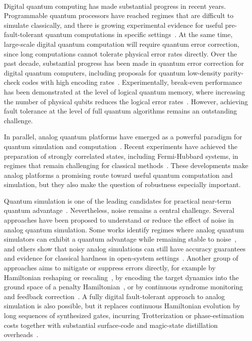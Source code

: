 \documentclass[10pt,twocolumn,superscriptaddress,aps,amsmath,amssymb,citeautoscript,floatfix,prx,longbibliography]{revtex4-2}
\newcounter{alg}
\theoremstyle{plain}
\theoremstyle{plain}
\theoremstyle{plain}
\theoremstyle{plain}
\theoremstyle{plain}
\theoremstyle{plain}
\begin{document}
\\
Digital quantum computing has made substantial progress in recent years. Programmable quantum processors have reached regimes that are difficult to simulate classically, and there is growing experimental evidence for useful pre-fault-tolerant quantum computations in specific settings~\cite{Arute2019,Kim2023}. At the same time, large-scale digital quantum computation will require quantum error correction, since long computations cannot tolerate physical error rates directly. Over the past decade, substantial progress has been made in quantum error correction for digital quantum computers, including proposals for quantum low-density parity-check codes with high encoding rates~\cite{Bravyi2024,Panteleev2022,Breuckmann2021,Qian1}. Experimentally, break-even performance has been demonstrated at the level of logical quantum memory, where increasing the number of physical qubits reduces the logical error rates~\cite{Krinner2022,AcharyaGoogle2025,RyanAnderson2021,daSilvaPaetznick2024,Reichardt2024Tesseract,Bluvstein2024,Reichardt2024NeutralAtom}. However, achieving fault tolerance at the level of full quantum algorithms remains an outstanding challenge.

In parallel, analog quantum platforms have emerged as a powerful paradigm for quantum simulation and computation~\cite{Bloch2012,Browaeys2020,Daley2022,Schaefer2020}. Recent experiments have achieved the preparation of strongly correlated states, including Fermi-Hubbard systems, in regimes that remain challenging for classical methods~\cite{Xu2025,Mazurenko2017,Shao2024,Chalopin2024}. 
These developments make analog platforms a promising route toward useful quantum computation and simulation, but they also make the question of robustness especially important.

Quantum simulation is one of the leading candidates for practical near-term quantum advantage~\cite{Daley2022}. Nevertheless, noise remains a central challenge. Several approaches have been proposed to understand or reduce the effect of noise in analog quantum simulation. Some works identify regimes where analog quantum simulators can exhibit a quantum advantage while remaining stable to noise~\cite{Trivedi2024AnalogStability}, and others show that noisy analog simulations can still have accuracy guarantees and evidence for classical hardness in open-system settings~\cite{Kashyap2025AnalogOpenSimulation}. Another group of approaches aims to mitigate or suppress errors directly, for example by Hamiltonian reshaping or rescaling~\cite{Guo2025HamiltonianReshaping}, by encoding the target dynamics into the ground space of a penalty Hamiltonian~\cite{Cao2024RobustAnalog}, or by continuous syndrome monitoring and feedback correction~\cite{Atalaya2021ContinuousQEC}. A fully digital fault-tolerant approach to analog simulation is also possible, but it replaces continuous Hamiltonian evolution by long sequences of synthesized gates, incurring Trotterization or phase-estimation costs together with substantial surface-code and magic-state distillation overheads~\cite{Reiher2017ReactionMechanisms,Kivlichan2020Trotter}.
\end{document}
